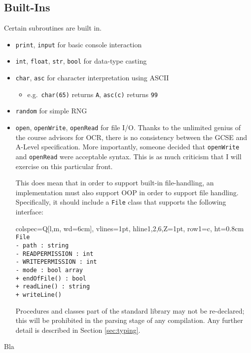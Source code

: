 \documentclass{article}
\newcommand{\code}[1]{\colorbox{gray!20}{\texttt{#1}}}
\begin{document}
    \subsection{Built-Ins}
    Certain subroutines are built in.
    \begin{itemize}
        \item \code{print}, \code{input} for basic console interaction
        \item \code{int}, \code{float}, \code{str}, \code{bool} for data-type casting
        \item \code{char}, \code{asc} for character interpretation using ASCII 
            \begin{itemize}
                \item e.g.\ \code{char(65)} returns \code{\textquotesingle A\textquotesingle}, \code{asc(\textquotesingle c\textquotesingle)} returns \code{99}
            \end{itemize}
        \item \code{random} for simple RNG
        \item \code{open}, \code{openWrite}, \code{openRead} for file I/O. \newline 
        Thanks to the unlimited genius of the course advisors for OCR, there is no consistency between the GCSE and A-Level specification. More importantly, someone decided that \code{openWrite} and \code{openRead} were acceptable syntax. This is as much criticism that I will exercise on this particular front.
    
        This does mean that in order to support built-in file-handling, an implementation must also support OOP in order to support file handling. Specifically, it should include a \code{File} class that supports the following interface:
        \begin{center}
            \begin{tblr}{colspec={Q[l,m, wd=6cm]}, vlines={1pt}, hline{1,2,6,Z}={1pt}, row{1}={c, ht=0.8cm}}
                \texttt{File}\\
                \texttt{- path : string } \\
                \texttt{- READ\textunderscore PERMISSION : int } \\
                \texttt{- WRITE\textunderscore PERMISSION : int } \\
                \texttt{- mode : bool array }\\
                \texttt{+ endOfFile() : bool} \\
                \texttt{+ readLine() : string} \\
                \texttt{+ writeLine() } \\
            \end{tblr}
        \end{center}
        
        Procedures and classes part of the standard library may not be re-declared; this will be prohibited in the parsing stage of any compilation. Any further detail is described in Section \ref{sec:typing}.
    \end{itemize}
    Bla
\end{document}
